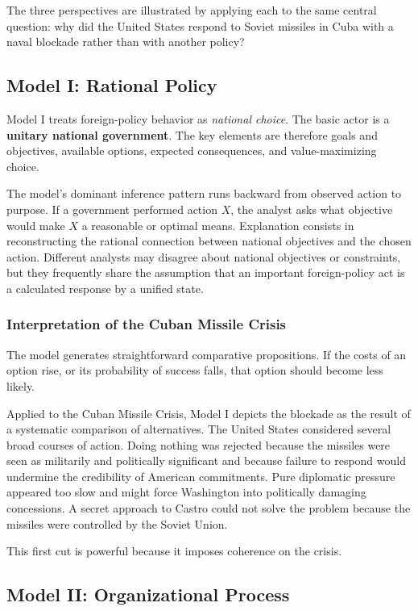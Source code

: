 The three perspectives are illustrated by applying each to the same central question: why did the United States respond to Soviet missiles in Cuba with a naval blockade rather than with another policy?

\subsection{Model I: Rational Policy}

Model I treats foreign-policy behavior as \emph{national choice}. The basic actor is a \textbf{unitary national government}. The key elements are therefore goals and objectives, available options, expected consequences, and value-maximizing choice.

The model's dominant inference pattern runs backward from observed action to purpose. If a government performed action $X$, the analyst asks what objective would make $X$ a reasonable or optimal means. Explanation consists in reconstructing the rational connection between national objectives and the chosen action. Different analysts may disagree about national objectives or constraints, but they frequently share the assumption that an important foreign-policy act is a calculated response by a unified state.

\subsubsection{Interpretation of the Cuban Missile Crisis}
The model generates straightforward comparative propositions. If the costs of an option rise, or its probability of success falls, that option should become less likely.

Applied to the Cuban Missile Crisis, Model I depicts the blockade as the result of a systematic comparison of alternatives. The United States considered several broad courses of action. Doing nothing was rejected because the missiles were seen as militarily and politically significant and because failure to respond would undermine the credibility of American commitments. Pure diplomatic pressure appeared too slow and might force Washington into politically damaging concessions. A secret approach to Castro could not solve the problem because the missiles were controlled by the Soviet Union.

This first cut is powerful because it imposes coherence on the crisis.

\subsection{Model II: Organizational Process}


